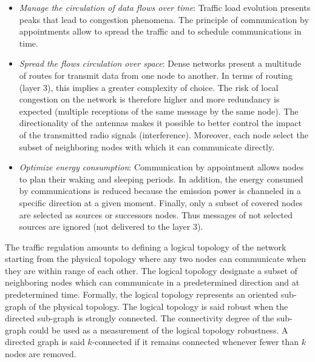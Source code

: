 \documentclass[letterpaper, 10 pt, conference]{ieeeconf}
\begin{document}
\begin{itemize}
\item \textit{Manage the circulation of data flows over time}: Traffic load evolution presents peaks that lead to congestion phenomena. The principle of communication by appointments allow to spread the traffic and to schedule communications in time.

\item \textit{Spread the flows circulation over space}: Dense networks present a multitude of routes for transmit data from one node to another. In terms of routing (layer 3), this implies a greater complexity of choice. The risk of local congestion on the network is therefore higher and more redundancy is expected (multiple receptions of the same message by the same node). The directionality of the antennas makes it possible to better control the impact of the transmitted radio signals (interference). Moreover, each node select the subset of neighboring nodes with which it can communicate directly. 

\item \textit{Optimize energy consumption}: Communication by appointment allows nodes to plan their waking and sleeping periods. In addition, the energy consumed by communications is reduced because the emission power is channeled in a specific direction at a given moment. Finally, only a subset of covered nodes are selected as sources or successors nodes. Thus messages of not selected sources are ignored (not delivered to the layer 3). 
\end{itemize}

The traffic regulation amounts to defining a logical topology of the network starting from the physical topology where any two nodes can communicate when they are within range of each other. The logical topology designate a subset of neighboring nodes which can communicate in a predetermined direction and at predetermined time. Formally, the logical topology represents an oriented sub-graph of the physical topology. The logical topology is said robust when the directed sub-graph is strongly connected. The connectivity degree of the sub-graph could be used as a measurement of the logical topology robustness. A directed graph is said $k$-connected if it remains connected whenever fewer than $k$ nodes are removed.
\end{document}
